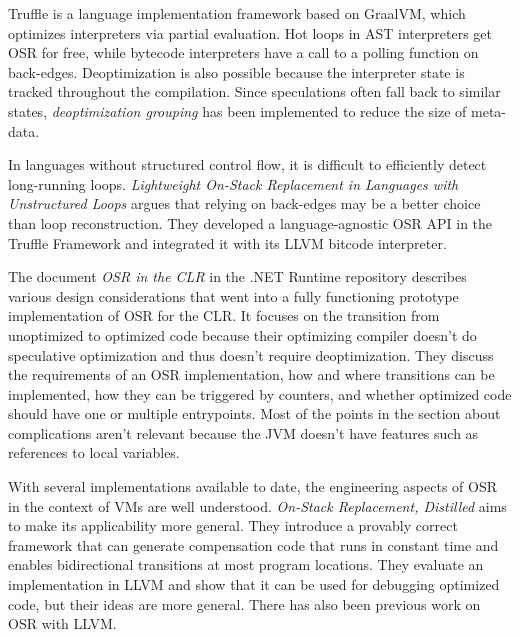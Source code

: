 \documentclass[draft,final]{vutinfth} %
\begin{document}
    Truffle\cite{truffle} is a language implementation framework based on GraalVM\cite{graalvm},
    which optimizes interpreters via partial evaluation.
    Hot loops in AST interpreters get OSR for free,
    while bytecode interpreters have a call to a polling function on back-edges.
    Deoptimization is also possible because the interpreter state is tracked throughout the compilation.
    Since speculations often fall back to similar states,
    \textit{deoptimization grouping} has been implemented to reduce the size of meta-data\cite{deopt-grouping}.

    In languages without structured control flow,
    it is difficult to efficiently detect long-running loops.
    \textit{Lightweight On-Stack Replacement in Languages with Unstructured Loops}\cite{10.1145/3486606.3486782}
    argues that relying on back-edges may be a better choice than loop reconstruction.
    They developed a language-agnostic OSR API in the Truffle Framework\cite{truffle} and integrated it with its LLVM bitcode interpreter.

    The document \textit{OSR in the CLR}\cite{CLR-OSR} in the .NET Runtime repository describes various design considerations that
    went into a fully functioning prototype implementation of OSR for the CLR.
    It focuses on the transition from unoptimized to optimized code because their optimizing
    compiler doesn't do speculative optimization and thus doesn't require deoptimization.
    They discuss the requirements of an OSR implementation,
    how and where transitions can be implemented,
    how they can be triggered by counters,
    and whether optimized code should have one or multiple entrypoints.
    Most of the points in the section about complications aren't relevant
    because the JVM doesn't have features such as references to local variables.

    With several implementations available to date,
    the engineering aspects of OSR in the context of VMs are well understood.
    \textit{On-Stack Replacement, Distilled}\cite{10.1145/3192366.3192396}
    aims to make its applicability more general.
    They introduce a provably correct framework that can generate compensation code
    that runs in constant time and
    enables bidirectional transitions at most program locations.
    They evaluate an implementation in LLVM and show
    that it can be used for debugging optimized code,
    but their ideas are more general.
    There has also been previous work on OSR with LLVM\cite{llvm-osr-1,llvm-osr-2}.
\end{document}
